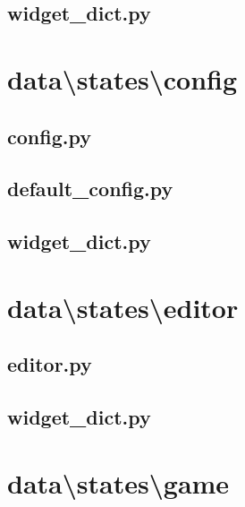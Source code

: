 \documentclass[../main/main.tex]{subfiles}
\begin{document}
\subsection{widget\_dict.py}

\label{src:data/states/browser/widget_dict.py}

\section{data\textbackslash states\textbackslash config}
\subsection{config.py}

\label{src:data/states/config/config.py}

\subsection{default\_config.py}

\label{src:data/states/config/default_config.py}

\subsection{widget\_dict.py}

\label{src:data/states/config/widget_dict.py}

\section{data\textbackslash states\textbackslash editor}
\subsection{editor.py}

\label{src:data/states/editor/editor.py}

\subsection{widget\_dict.py}

\label{src:data/states/editor/widget_dict.py}

\section{data\textbackslash states\textbackslash game}
\end{document}
